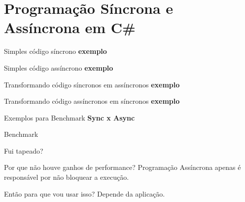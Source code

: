 \documentclass[10pt]{beamer}
\begin{document}
\section{Programação Síncrona e Assíncrona em C\#}

\begin{frame}{Simples código síncrono}
	\textbf{exemplo}
\end{frame}

\begin{frame}{Simples código assíncrono}
	\textbf{exemplo}
\end{frame}

\begin{frame}{Transformando código síncronos em assíncronos}
	\textbf{exemplo}
\end{frame}

\begin{frame}{Transformando código assíncronos em síncronos}
	\textbf{exemplo}
\end{frame}

\begin{frame}{Exemplos para Benchmark}
	\textbf{Sync x Async}
\end{frame}


\begin{frame}{Benchmark}
	\begin{figure}
	\end{figure}
\end{frame}

\begin{frame}{Fui tapeado?}
	\begin{alertblock}{Por que não houve ganhos de performance?}
		Programação Assíncrona apenas é responsável por não bloquear a execução.
	\end{alertblock}
	\begin{exampleblock}{Então para que vou usar isso?}
		Depende da aplicação.
	\end{exampleblock}
\end{frame}
\end{document}
